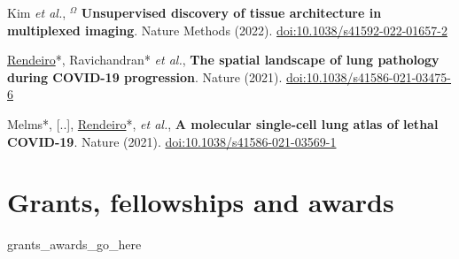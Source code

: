 \documentclass[11pt,a4paper,roman]{moderncv} %
\begin{document}
        {Kim \textit{et al.}, $^\Omega$ \textbf{Unsupervised discovery of tissue architecture in multiplexed imaging}. Nature Methods (2022). \href{https://doi.org/10.1038/s41592-022-01657-2}{doi:10.1038/s41592-022-01657-2}}

        {\underline{Rendeiro}*, Ravichandran* \textit{et al.}, \textbf{The spatial landscape of lung pathology during COVID-19 progression}. Nature (2021). \href{https://doi.org/10.1038/s41586-021-03475-6}{doi:10.1038/s41586-021-03475-6}}

        {Melms*, [..], \underline{Rendeiro}*, \textit{et al.}, \textbf{A molecular single-cell lung atlas of lethal COVID-19}. Nature (2021). \href{https://doi.org/10.1038/s41586-021-03569-1}{doi:10.1038/s41586-021-03569-1}}


\section{Grants, fellowships and awards}
    {{grants_awards_go_here}}
\end{document}
